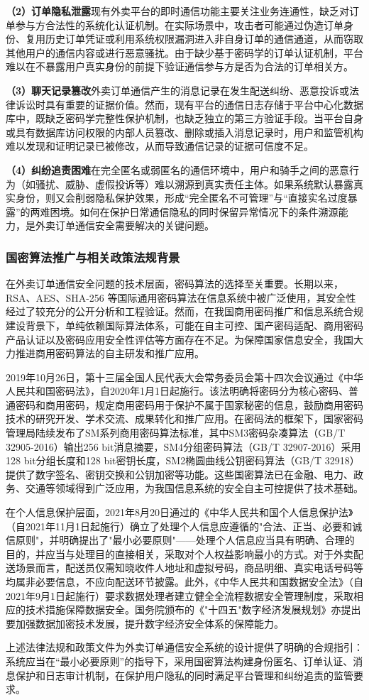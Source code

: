 \textbf{（2）订单隐私泄露}\quad 现有外卖平台的即时通信功能主要关注业务连通性，缺乏对订单参与方合法性的系统化认证机制。在实际场景中，攻击者可能通过伪造订单身份、复用历史订单凭证或利用系统权限漏洞进入非自身订单的通信通道，从而窃取其他用户的通信内容或进行恶意骚扰。由于缺少基于密码学的订单认证机制，平台难以在不暴露用户真实身份的前提下验证通信参与方是否为合法的订单相关方。

\textbf{（3）聊天记录篡改}\quad 外卖订单通信产生的消息记录在发生配送纠纷、恶意投诉或法律诉讼时具有重要的证据价值。然而，现有平台的通信日志存储于平台中心化数据库中，既缺乏密码学完整性保护机制，也缺乏独立的第三方验证手段。当平台自身或具有数据库访问权限的内部人员篡改、删除或插入消息记录时，用户和监管机构难以发现和证明记录已被修改，从而导致通信记录的证据可信度不足。

\textbf{（4）纠纷追责困难}\quad 在完全匿名或弱匿名的通信环境中，用户和骑手之间的恶意行为（如骚扰、威胁、虚假投诉等）难以溯源到真实责任主体。如果系统默认暴露真实身份，则又会削弱隐私保护效果，形成“完全匿名不可管理”与“直接实名过度暴露”的两难困境。如何在保护日常通信隐私的同时保留异常情况下的条件溯源能力，是外卖订单通信安全需要解决的关键问题。

\subsubsection{国密算法推广与相关政策法规背景}

在外卖订单通信安全问题的技术层面，密码算法的选择至关重要。长期以来，RSA、AES、SHA-256 等国际通用密码算法在信息系统中被广泛使用，其安全性经过了较充分的公开分析和工程验证。然而，在我国商用密码推广和信息系统合规建设背景下，单纯依赖国际算法体系，可能在自主可控、国产密码适配、商用密码产品认证以及密码应用安全性评估等方面存在不足。为保障国家信息安全，我国大力推进商用密码算法的自主研发和推广应用。

2019年10月26日，第十三届全国人民代表大会常务委员会第十四次会议通过《中华人民共和国密码法》，自2020年1月1日起施行。该法明确将密码分为核心密码、普通密码和商用密码，规定商用密码用于保护不属于国家秘密的信息，鼓励商用密码技术的研究开发、学术交流、成果转化和推广应用。在密码法的框架下，国家密码管理局陆续发布了SM系列商用密码算法标准，其中SM3密码杂凑算法（GB/T 32905-2016）输出256 bit消息摘要，SM4分组密码算法（GB/T 32907-2016）采用128 bit分组长度和128 bit密钥长度，SM2椭圆曲线公钥密码算法（GB/T 32918）提供了数字签名、密钥交换和公钥加密等功能。这些国密算法已在金融、电力、政务、交通等领域得到广泛应用，为我国信息系统的安全自主可控提供了技术基础。

在个人信息保护层面，2021年8月20日通过的《中华人民共和国个人信息保护法》（自2021年11月1日起施行）确立了处理个人信息应遵循的"合法、正当、必要和诚信原则"，并明确提出了"最小必要原则"——处理个人信息应当具有明确、合理的目的，并应当与处理目的直接相关，采取对个人权益影响最小的方式。对于外卖配送场景而言，配送员仅需知晓收件人地址和虚拟号码，商品明细、真实电话号码等均属非必要信息，不应向配送环节披露。此外，《中华人民共和国数据安全法》（自2021年9月1日起施行）要求数据处理者建立健全全流程数据安全管理制度，采取相应的技术措施保障数据安全。国务院颁布的《"十四五"数字经济发展规划》亦提出要加强数据加密技术发展，提升数字经济安全体系的保障能力。

上述法律法规和政策文件为外卖订单通信安全系统的设计提供了明确的合规指引：系统应当在“最小必要原则”的指导下，采用国密算法构建身份匿名、订单认证、消息保护和日志审计机制，在保护用户隐私的同时满足平台管理和纠纷追责的监管要求。
